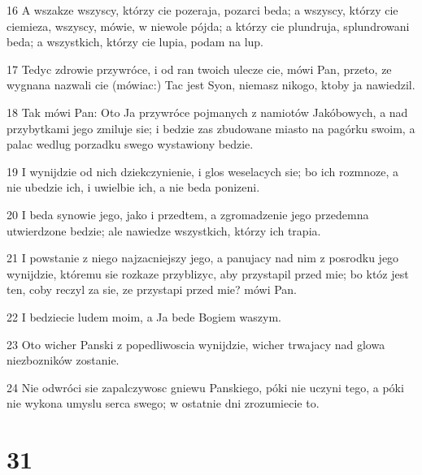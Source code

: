 \par 16 A wszakze wszyscy, którzy cie pozeraja, pozarci beda; a wszyscy, którzy cie ciemieza, wszyscy, mówie, w niewole pójda; a którzy cie plundruja, splundrowani beda; a wszystkich, którzy cie lupia, podam na lup.
\par 17 Tedyc zdrowie przywróce, i od ran twoich ulecze cie, mówi Pan, przeto, ze wygnana nazwali cie (mówiac:) Tac jest Syon, niemasz nikogo, ktoby ja nawiedzil.
\par 18 Tak mówi Pan: Oto Ja przywróce pojmanych z namiotów Jakóbowych, a nad przybytkami jego zmiluje sie; i bedzie zas zbudowane miasto na pagórku swoim, a palac wedlug porzadku swego wystawiony bedzie.
\par 19 I wynijdzie od nich dziekczynienie, i glos weselacych sie; bo ich rozmnoze, a nie ubedzie ich, i uwielbie ich, a nie beda ponizeni.
\par 20 I beda synowie jego, jako i przedtem, a zgromadzenie jego przedemna utwierdzone bedzie; ale nawiedze wszystkich, którzy ich trapia.
\par 21 I powstanie z niego najzacniejszy jego, a panujacy nad nim z posrodku jego wynijdzie, któremu sie rozkaze przyblizyc, aby przystapil przed mie; bo któz jest ten, coby reczyl za sie, ze przystapi przed mie? mówi Pan.
\par 22 I bedziecie ludem moim, a Ja bede Bogiem waszym.
\par 23 Oto wicher Panski z popedliwoscia wynijdzie, wicher trwajacy nad glowa niezbozników zostanie.
\par 24 Nie odwróci sie zapalczywosc gniewu Panskiego, póki nie uczyni tego, a póki nie wykona umyslu serca swego; w ostatnie dni zrozumiecie to.

\chapter{31}

